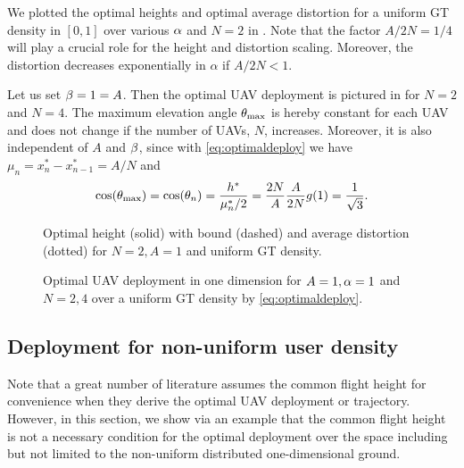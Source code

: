 \documentclass[12pt,onecolumn,final,letterpaper]{IEEEtran}
\newcounter{example}[section]
\newenvironment{example}[1][]{\refstepcounter{example}\par\vspace{1.5ex}\noindent{\em Example~\theexample. #1}}{\par\vspace{1.5ex}}
\newcommand{\junstart}{\color{black}}
\begin{document}
\begin{example}
We plotted  the optimal heights and optimal average distortion for a uniform GT density in $[0,1]$ over various $\alpha$
and $N=2$ in . Note that the factor $A/2N=1/4$ will play a crucial role for the height and
distortion scaling. Moreover, the distortion decreases exponentially in $\alpha$ if $A/2N<1$.

Let us set $\beta=1=A$. Then the optimal UAV deployment is pictured in  for $N=2$ and $N=4$. The
maximum elevation angle $\theta_{\text{max}}$ is hereby constant for each UAV and does not change if the number of UAVs,
$N$, increases.  Moreover, it is also independent of $A$ and $\beta$, since with \eqref{eq:optimaldeploy} we have
$\mu_n=x^*_n-x^*_{n-1}=A/N$ and
%
\begin{align}
  \cos(\theta_{\text{max}})=\cos(\theta_n)= \frac{h^*}{\mu^*_n/2}= \frac{2N}{A}\frac{A}{2N}   g(1)= \frac{1}{\sqrt{3}}.
\end{align}
\end{example}
% 
\begin{figure}
\begin{minipage}[b]{0.4\textwidth}
  \vspace{1ex}
\def\svgwidth{1.1\textwidth} \scriptsize{
  }
  \vspace{-3.2ex}
  \caption{{\small Optimal height (solid) with bound (dashed) and average distortion (dotted) for 
  $N=2,A=1$ and uniform GT density.}}
  \label{fig:goptdopt}
\end{minipage}
\hfill
  \begin{minipage}[b]{0.56\textwidth}
\hspace{-2ex} 
    \def\svgwidth{1.1\textwidth} \scriptsize{
      }
      \caption{{\small Optimal UAV deployment in one dimension for $A=1,\alpha=1$ and $N=2,4$ over a uniform GT density
      by \eqref{eq:optimaldeploy}.}}
      \label{fig:uavonedim}
    \end{minipage}
\end{figure}
%


\junstart
{} %
\subsection{Deployment for non-uniform user density}
%
Note that a great number of literature assumes the common flight height for convenience when they derive the optimal UAV
deployment or trajectory.  However, in this section, we show via an example that the common flight height is not a
necessary condition for the optimal deployment over the space including but not limited to the non-uniform distributed
one-dimensional ground.
\fi %
\end{document}
